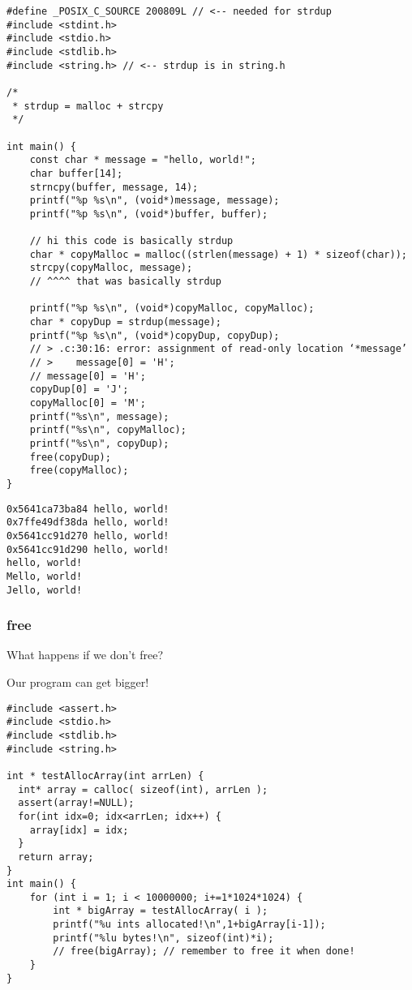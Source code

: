 \documentclass[11pt]{article}
\begin{document}
\begin{verbatim}
#define _POSIX_C_SOURCE 200809L // <-- needed for strdup
#include <stdint.h>
#include <stdio.h>
#include <stdlib.h>
#include <string.h> // <-- strdup is in string.h

/*
 * strdup = malloc + strcpy
 */

int main() {
    const char * message = "hello, world!";
    char buffer[14];
    strncpy(buffer, message, 14);    
    printf("%p %s\n", (void*)message, message);    
    printf("%p %s\n", (void*)buffer, buffer);    

    // hi this code is basically strdup
    char * copyMalloc = malloc((strlen(message) + 1) * sizeof(char));
    strcpy(copyMalloc, message);
    // ^^^^ that was basically strdup

    printf("%p %s\n", (void*)copyMalloc, copyMalloc);    
    char * copyDup = strdup(message);
    printf("%p %s\n", (void*)copyDup, copyDup);
    // > .c:30:16: error: assignment of read-only location ‘*message’
    // >    message[0] = 'H';
    // message[0] = 'H';
    copyDup[0] = 'J';
    copyMalloc[0] = 'M';
    printf("%s\n", message);    
    printf("%s\n", copyMalloc);    
    printf("%s\n", copyDup);
    free(copyDup);
    free(copyMalloc);
}
\end{verbatim}

\begin{verbatim}
0x5641ca73ba84 hello, world!
0x7ffe49df38da hello, world!
0x5641cc91d270 hello, world!
0x5641cc91d290 hello, world!
hello, world!
Mello, world!
Jello, world!
\end{verbatim}

\subsubsection{free}
\label{sec:orgb7c91be}

What happens if we don't free?

Our program can get bigger!



\begin{verbatim}
#include <assert.h>
#include <stdio.h>
#include <stdlib.h>
#include <string.h>

int * testAllocArray(int arrLen) {
  int* array = calloc( sizeof(int), arrLen );
  assert(array!=NULL);
  for(int idx=0; idx<arrLen; idx++) {
    array[idx] = idx;
  }
  return array;
}
int main() {
    for (int i = 1; i < 10000000; i+=1*1024*1024) {
        int * bigArray = testAllocArray( i );
        printf("%u ints allocated!\n",1+bigArray[i-1]);
        printf("%lu bytes!\n", sizeof(int)*i);
        // free(bigArray); // remember to free it when done!
    }
}
\end{verbatim}
\end{document}
